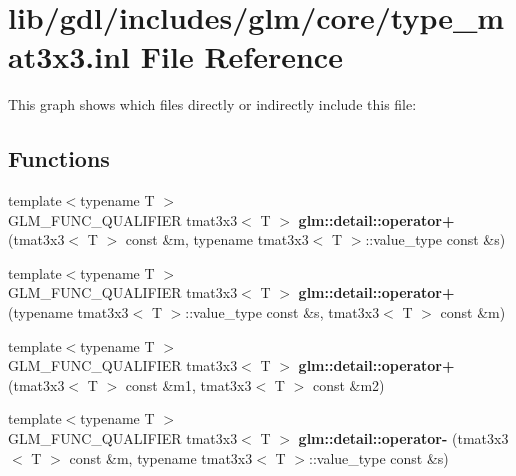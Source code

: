 \hypertarget{type__mat3x3_8inl}{}\section{lib/gdl/includes/glm/core/type\+\_\+mat3x3.inl File Reference}
\label{type__mat3x3_8inl}
This graph shows which files directly or indirectly include this file\+:
\subsection*{Functions}
\begin{DoxyCompactItemize}
\item 
\hypertarget{namespaceglm_1_1detail_a57257ebf7c5a307ceccf0712faed4b4f}{}{\footnotesize template$<$typename T $>$ }\\G\+L\+M\+\_\+\+F\+U\+N\+C\+\_\+\+Q\+U\+A\+L\+I\+F\+I\+E\+R tmat3x3$<$ T $>$ {\bfseries glm\+::detail\+::operator+} (tmat3x3$<$ T $>$ const \&m, typename tmat3x3$<$ T $>$\+::value\+\_\+type const \&s)\label{namespaceglm_1_1detail_a57257ebf7c5a307ceccf0712faed4b4f}

\item 
\hypertarget{namespaceglm_1_1detail_ac6c596ee3a5aa2947daba1472261f2ec}{}{\footnotesize template$<$typename T $>$ }\\G\+L\+M\+\_\+\+F\+U\+N\+C\+\_\+\+Q\+U\+A\+L\+I\+F\+I\+E\+R tmat3x3$<$ T $>$ {\bfseries glm\+::detail\+::operator+} (typename tmat3x3$<$ T $>$\+::value\+\_\+type const \&s, tmat3x3$<$ T $>$ const \&m)\label{namespaceglm_1_1detail_ac6c596ee3a5aa2947daba1472261f2ec}

\item 
\hypertarget{namespaceglm_1_1detail_ac854a7cbeb0bf0cb6ceabcde6c3631fb}{}{\footnotesize template$<$typename T $>$ }\\G\+L\+M\+\_\+\+F\+U\+N\+C\+\_\+\+Q\+U\+A\+L\+I\+F\+I\+E\+R tmat3x3$<$ T $>$ {\bfseries glm\+::detail\+::operator+} (tmat3x3$<$ T $>$ const \&m1, tmat3x3$<$ T $>$ const \&m2)\label{namespaceglm_1_1detail_ac854a7cbeb0bf0cb6ceabcde6c3631fb}

\item 
\hypertarget{namespaceglm_1_1detail_a98d0dc0519f2e0c7f7c25ac1644d9b37}{}{\footnotesize template$<$typename T $>$ }\\G\+L\+M\+\_\+\+F\+U\+N\+C\+\_\+\+Q\+U\+A\+L\+I\+F\+I\+E\+R tmat3x3$<$ T $>$ {\bfseries glm\+::detail\+::operator-\/} (tmat3x3$<$ T $>$ const \&m, typename tmat3x3$<$ T $>$\+::value\+\_\+type const \&s)\label{namespaceglm_1_1detail_a98d0dc0519f2e0c7f7c25ac1644d9b37}


\end{DoxyCompactItemize}

